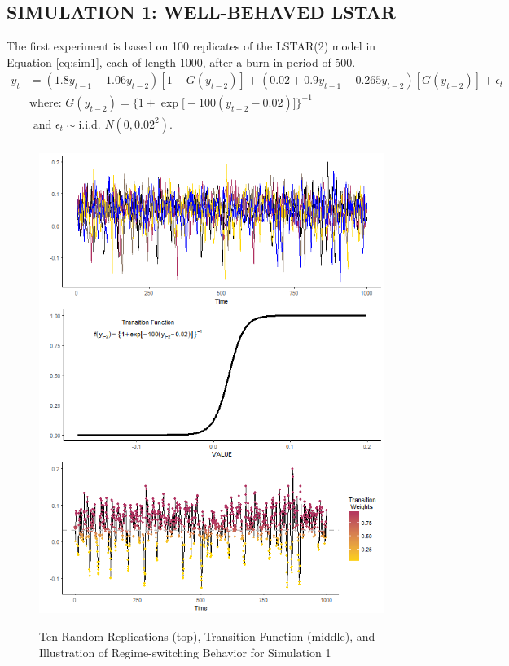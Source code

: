 \vskip 3mm

\subsection{SIMULATION 1: WELL-BEHAVED LSTAR}

The first experiment is based on 100 replicates of the LSTAR(2) model in Equation \ref{eq:sim1}, each of length 1000, after a burn-in period of
500.
\begin{equation}
	\begin{split}
		\label{eq:sim1}
		y_t&=(1.8y_{t-1}-1.06y_{t-2})[1-G(y_{t-2})] + (0.02+0.9y_{t-1}-0.265y_{t-2})[G(y_{t-2})]+\epsilon_t\\
		& \textrm{where: } G(y_{t-2})=\bigg\{1+\exp\big[-100(y_{t-2}-0.02)\big]\bigg\}^{-1} \\
		&\textrm{ and }\epsilon_t \sim \textrm{i.i.d. }  N (0,0.02^2).\\
	\end{split}
\end{equation}

\begin{figure}
	\centering
	\caption{Ten Random Replications (top), Transition Function (middle), and Illustration of Regime-switching Behavior  for Simulation 1 }
	\includegraphics[scale=.7]{sim1plots}
	\label{fig:sim1plots}
\end{figure}


